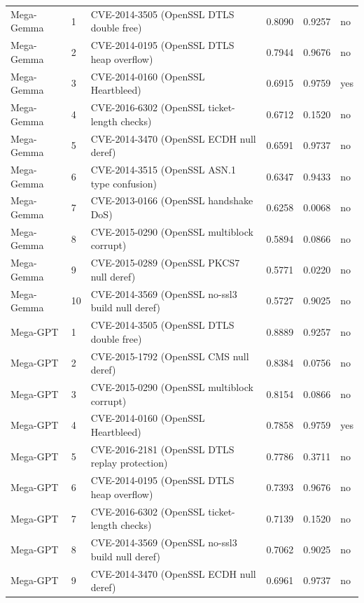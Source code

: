 \documentclass[11pt]{article}
\begin{document}
\begin{longtable}{llp{}rrl}
Mega-Gemma   &  1 & CVE-2014-3505 (OpenSSL DTLS double free)            & 0.8090 & 0.9257 & no \\
Mega-Gemma   &  2 & CVE-2014-0195 (OpenSSL DTLS heap overflow)          & 0.7944 & 0.9676 & no \\
Mega-Gemma   &  3 & CVE-2014-0160 (OpenSSL Heartbleed)                  & 0.6915 & 0.9759 & yes \\
Mega-Gemma   &  4 & CVE-2016-6302 (OpenSSL ticket-length checks)        & 0.6712 & 0.1520 & no \\
Mega-Gemma   &  5 & CVE-2014-3470 (OpenSSL ECDH null deref)             & 0.6591 & 0.9737 & no \\
Mega-Gemma   &  6 & CVE-2014-3515 (OpenSSL ASN.1 type confusion)        & 0.6347 & 0.9433 & no \\
Mega-Gemma   &  7 & CVE-2013-0166 (OpenSSL handshake DoS)               & 0.6258 & 0.0068 & no \\
Mega-Gemma   &  8 & CVE-2015-0290 (OpenSSL multiblock corrupt)          & 0.5894 & 0.0866 & no \\
Mega-Gemma   &  9 & CVE-2015-0289 (OpenSSL PKCS7 null deref)            & 0.5771 & 0.0220 & no \\
Mega-Gemma   & 10 & CVE-2014-3569 (OpenSSL no-ssl3 build null deref)    & 0.5727 & 0.9025 & no \\
\midrule
Mega-GPT     &  1 & CVE-2014-3505 (OpenSSL DTLS double free)            & 0.8889 & 0.9257 & no \\
Mega-GPT     &  2 & CVE-2015-1792 (OpenSSL CMS null deref)              & 0.8384 & 0.0756 & no \\
Mega-GPT     &  3 & CVE-2015-0290 (OpenSSL multiblock corrupt)          & 0.8154 & 0.0866 & no \\
Mega-GPT     &  4 & CVE-2014-0160 (OpenSSL Heartbleed)                  & 0.7858 & 0.9759 & yes \\
Mega-GPT     &  5 & CVE-2016-2181 (OpenSSL DTLS replay protection)      & 0.7786 & 0.3711 & no \\
Mega-GPT     &  6 & CVE-2014-0195 (OpenSSL DTLS heap overflow)          & 0.7393 & 0.9676 & no \\
Mega-GPT     &  7 & CVE-2016-6302 (OpenSSL ticket-length checks)        & 0.7139 & 0.1520 & no \\
Mega-GPT     &  8 & CVE-2014-3569 (OpenSSL no-ssl3 build null deref)    & 0.7062 & 0.9025 & no \\
Mega-GPT     &  9 & CVE-2014-3470 (OpenSSL ECDH null deref)             & 0.6961 & 0.9737 & no \\

\end{longtable}
\end{document}

